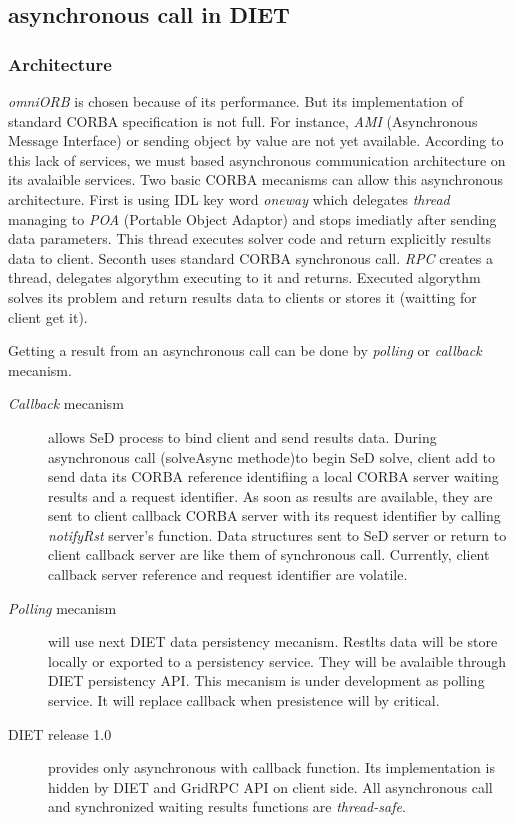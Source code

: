   \subsection{asynchronous call in DIET}

  \subsubsection{Architecture}

  \emph{omniORB} is chosen because of its performance. But its implementation
  of standard CORBA specification is not full. For instance, \emph{AMI} 
  (Asynchronous Message Interface) or sending object by value are not yet 
  available. According to this lack of services, we must based asynchronous 
  communication architecture on its avalaible services.
  Two basic CORBA mecanisms can allow this asynchronous architecture.
  First is using IDL key word \emph{oneway} which delegates \emph{thread} managing
  to \emph{POA} (Portable Object Adaptor) and stops imediatly after sending data parameters. This thread
  executes solver code and return explicitly results data to client.
  Seconth uses standard CORBA synchronous call.
  \emph{RPC} creates a thread, delegates algorythm executing to it and returns.
  Executed algorythm solves its problem and return results data to clients or stores
  it (waitting for client get it).

  Getting a result from an asynchronous call can be done by \emph{polling} or
  \emph{callback} mecanism. 

  \begin{description}
  \item[\emph{Callback} mecanism] allows SeD process to bind client and send results data.
  During asynchronous call (solveAsync methode)to begin SeD solve, client
  add to send data its CORBA reference identifiing a local CORBA server
  waiting results and a request identifier.
  As soon as results are available, they are sent to client callback CORBA server
  with its request identifier by calling \emph{notifyRst} server's function.
  Data structures sent to SeD server or return to client callback server are like
  them of synchronous call. Currently, client callback server reference and request 
  identifier are volatile.
  \item[\emph{Polling} mecanism] will use next DIET data persistency mecanism.
  Restlts data will be store locally or exported to a persistency service.
  They will be avalaible through DIET persistency API. This mecanism is under 
  development as polling service. It will replace callback when presistence will
  by critical.
  \item[DIET release 1.0] provides only asynchronous with callback function. Its 
  implementation is hidden by DIET and GridRPC API on client side. All asynchronous call
  and synchronized waiting results functions are \emph{thread-safe}.
  \end{description}

